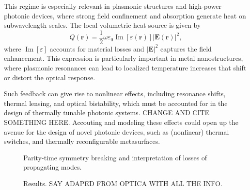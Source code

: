This regime is especially relevant in plasmonic structures and high-power photonic devices, where strong field confinement and absorption generate heat on subwavelength scales. The local volumetric heat source is given by~\cite{plasm_heat_source}
\[
Q(\mathbf{r}) = \frac{1}{2} \omega \varepsilon_0 \operatorname{Im}[\varepsilon(\mathbf{r})] |\mathbf{E}(\mathbf{r})|^2,
\]
where $\operatorname{Im}[\varepsilon]$ accounts for material losses and $|\mathbf{E}|^2$ captures the field enhancement. This expression is particularly important in metal nanostructures, where plasmonic resonances can lead to localized temperature increases that shift or distort the optical response.

Such feedback can give rise to nonlinear effects, including resonance shifts, thermal lensing, and optical bistability, which must be accounted for in the design of thermally tunable photonic systems. CHANGE AND CITE SOMETHING HERE. Accouting and modeling
these effects could open up the avenue for the design of novel photonic devices, such as (nonlinear) thermal switches,  and thermally reconfigurable metasurfaces.

\begin{figure}[tb]
    \centering
    \caption{Parity-time symmetry breaking and interpretation of losses of propagating modes.}
    \label{fig:thermo_opt}
\end{figure}

\begin{figure}[tb]
    \centering
    \caption{Results. SAY ADAPED FROM OPTICA WITH ALL THE INFO.}
    \label{fig:thermo_res}
\end{figure}

